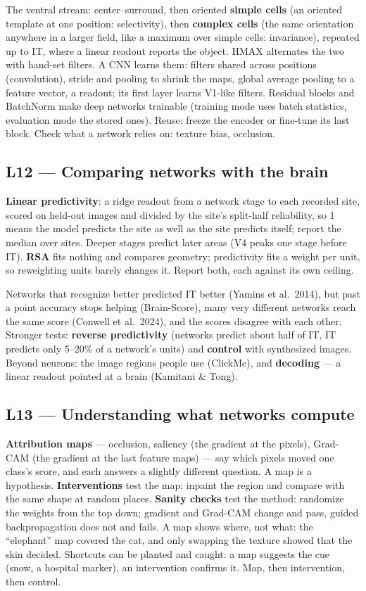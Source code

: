 \documentclass[11pt]{article}
\begin{document}
The ventral stream: center--surround, then oriented \textbf{simple cells} (an
oriented template at one position: selectivity), then \textbf{complex cells}
(the same orientation anywhere in a larger field, like a maximum over simple
cells: invariance), repeated up to IT, where a linear readout reports the object.
HMAX alternates the two with hand-set filters. A CNN learns them: filters shared
across positions (convolution), stride and pooling to shrink the maps, global
average pooling to a feature vector, a readout; its first layer learns V1-like
filters. Residual blocks and BatchNorm make deep networks trainable (training
mode uses batch statistics, evaluation mode the stored ones). Reuse: freeze the
encoder or fine-tune its last block. Check what a network relies on: texture
bias, occlusion.

\subsection{L12 --- Comparing networks with the brain}

\textbf{Linear predictivity}: a ridge readout from a network stage to each
recorded site, scored on held-out images and divided by the site's split-half
reliability, so 1 means the model predicts the site as well as the site predicts
itself; report the median over sites. Deeper stages predict later areas (V4
peaks one stage before IT). \textbf{RSA} fits nothing and compares geometry;
predictivity fits a weight per unit, so reweighting units barely changes it.
Report both, each against its own ceiling.

Networks that recognize better predicted IT better (Yamins et al.\ 2014), but
past a point accuracy stops helping (Brain-Score), many very different networks
reach the same score (Conwell et al.\ 2024), and the scores disagree with each
other. Stronger tests: \textbf{reverse predictivity} (networks predict about half
of IT, IT predicts only 5--20\% of a network's units) and \textbf{control} with
synthesized images. Beyond neurons: the image regions people use (ClickMe), and
\textbf{decoding} --- a linear readout pointed at a brain (Kamitani \& Tong).

\subsection{L13 --- Understanding what networks compute}

\textbf{Attribution maps} --- occlusion, saliency (the gradient at the pixels),
Grad-CAM (the gradient at the last feature maps) --- say which pixels moved one
class's score, and each answers a slightly different question. A map is a
hypothesis. \textbf{Interventions} test the map: inpaint the region and compare
with the same shape at random places. \textbf{Sanity checks} test the method:
randomize the weights from the top down; gradient and Grad-CAM change and pass,
guided backpropagation does not and fails. A map shows where, not what: the
``elephant'' map covered the cat, and only swapping the texture showed that the
skin decided. Shortcuts can be planted and caught: a map suggests the cue (snow,
a hospital marker), an intervention confirms it. Map, then intervention, then
control.
\end{document}
